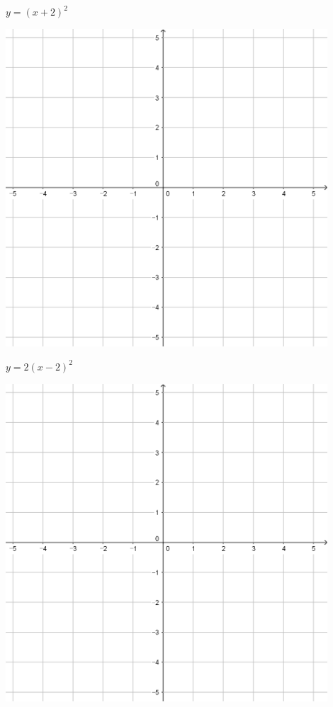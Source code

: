 \documentclass{oblivoir}
\begin{document}
\begin{minipage}{0.45\textwidth}\centering
\(y=(x+2)^2\)
\par\bigskip\includegraphics[width=0.9\textwidth]{55}
\end{minipage}
\begin{minipage}{0.45\textwidth}\centering
\(y=2(x-2)^2\)
\par\bigskip\includegraphics[width=0.9\textwidth]{55}
\end{minipage}\bigskip\bigskip\par
\end{document}
